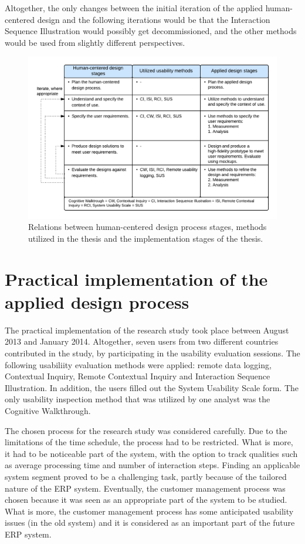 \documentclass[12pt,a4paper,oneside,pdftex]{report}
\begin{document}
Altogether, the only changes between the initial iteration of the applied human-centered design and the following iterations would be that the Interaction Sequence Illustration would possibly get decommissioned, and the other methods would be used from slightly different perspectives. 

\begin{figure}[H]
  	\centerline{
    	\includegraphics[width=1.3\textwidth]{./images/applied_hcd_process.png}
    	}
  	\caption{Relations between human-centered design process stages, methods utilized in the thesis and the implementation stages of the thesis.}
	\label{fig:hcd_process}
\end{figure}



\section{Practical implementation of the applied design process}
 \label{sec:implementation}

    
The practical implementation of the research study took place between August 2013 and January 2014. Altogether, seven users from two different countries contributed in the study, by participating in the usability evaluation sessions. The following usabiliity evaluation methods were applied: remote data logging, Contextual Inquiry, Remote Contextual Inquiry and Interaction Sequence Illustration. In addition, the users filled out the System Usability Scale form. The only usability inspection method that was utilized by one analyst was the Cognitive Walkthrough.

The chosen process for the research study was considered carefully. Due to the limitations of the time schedule, the process had to be restricted. What is more, it had to be noticeable part of the system, with the option to track qualities such as average processing time and number of interaction steps. Finding an applicable system segment proved to be a challenging task, partly because of the tailored nature of the ERP system. Eventually, the customer management process was chosen because it was seen as an appropriate part of the system to be studied. What is more, the customer management process has some anticipated usability issues (in the old system) and it is considered as an important part of the future ERP system.
\end{document}

